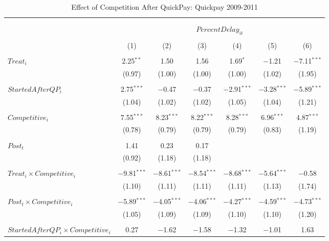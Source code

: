 \documentclass[
]{article}
\begin{document}
\begin{table}[H] \centering 
  \caption{Effect of Competition After QuickPay: Quickpay 2009-2011} 
  \label{} 
\small 
\begin{tabular}{@{\extracolsep{-3pt}}lcccccc} 
\\[-1.8ex]\hline 
\hline \\[-1.8ex] 
\\[-1.8ex] & \multicolumn{6}{c}{$PercentDelay_{it}$  } \\ 
\\[-1.8ex] & (1) & (2) & (3) & (4) & (5) & (6)\\ 
\hline \\[-1.8ex] 
 $Treat_i$ & 2.25$^{**}$ & 1.50 & 1.56 & 1.69$^{*}$ & $-$1.21 & $-$7.11$^{***}$ \\ 
  & (0.97) & (1.00) & (1.00) & (1.00) & (1.02) & (1.95) \\ 
  & & & & & & \\ 
 $StartedAfterQP_i$ & 2.75$^{***}$ & $-$0.47 & $-$0.37 & $-$2.91$^{***}$ & $-$3.28$^{***}$ & $-$5.89$^{***}$ \\ 
  & (1.04) & (1.02) & (1.02) & (1.05) & (1.04) & (1.21) \\ 
  & & & & & & \\ 
 $Competitive_i$ & 7.55$^{***}$ & 8.23$^{***}$ & 8.22$^{***}$ & 8.28$^{***}$ & 6.96$^{***}$ & 4.87$^{***}$ \\ 
  & (0.78) & (0.79) & (0.79) & (0.79) & (0.83) & (1.19) \\ 
  & & & & & & \\ 
 $Post_t$ & 1.41 & 0.23 & 0.17 &  &  &  \\ 
  & (0.92) & (1.18) & (1.18) &  &  &  \\ 
  & & & & & & \\ 
 $Treat_i \times Competitive_i$ & $-$9.81$^{***}$ & $-$8.61$^{***}$ & $-$8.54$^{***}$ & $-$8.68$^{***}$ & $-$5.64$^{***}$ & $-$0.58 \\ 
  & (1.10) & (1.11) & (1.11) & (1.11) & (1.13) & (1.74) \\ 
  & & & & & & \\ 
 $Post_t \times Competitive_i$ & $-$5.89$^{***}$ & $-$4.05$^{***}$ & $-$4.06$^{***}$ & $-$4.27$^{***}$ & $-$4.59$^{***}$ & $-$4.73$^{***}$ \\ 
  & (1.05) & (1.09) & (1.09) & (1.10) & (1.10) & (1.20) \\ 
  & & & & & & \\ 
 $StartedAfterQP_i \times Competitive_i$ & 0.27 & $-$1.62 & $-$1.58 & $-$1.32 & $-$1.01 & 1.63 \\ 

\end{tabular}
\end{table}
\end{document}
